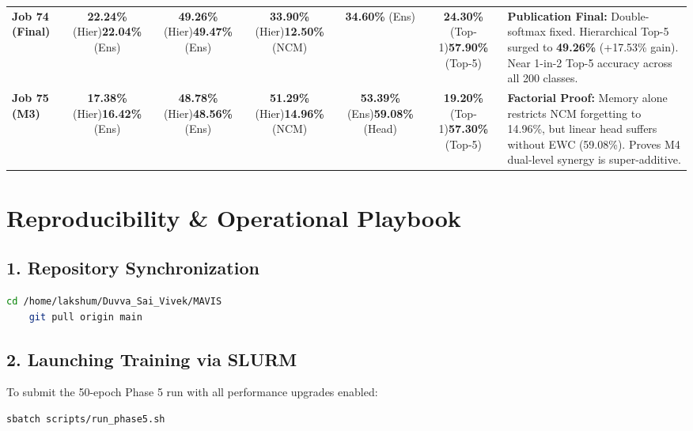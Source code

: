 \documentclass[11pt,a4paper]{article}
\begin{document}
\begin{table}[h!]
\begin{tabularx}{\textwidth}{p{3.2cm} c c c c c p{3.2cm}}
    \textbf{Job 74 (Final)} & \textbf{22.24\%} (Hier)\newline \textbf{22.04\%} (Ens) & \textbf{49.26\%} (Hier)\newline \textbf{49.47\%} (Ens) & \textbf{33.90\%} (Hier)\newline \textbf{12.50\%} (NCM) & \textbf{34.60\%} (Ens) & \textbf{24.30\%} (Top-1)\newline \textbf{57.90\%} (Top-5) & \textbf{Publication Final:} Double-softmax fixed. Hierarchical Top-5 surged to \textbf{49.26\%} (+17.53\% gain). Near 1-in-2 Top-5 accuracy across all 200 classes. \\
    \textbf{Job 75 (M3)} & \textbf{17.38\%} (Hier)\newline \textbf{16.42\%} (Ens) & \textbf{48.78\%} (Hier)\newline \textbf{48.56\%} (Ens) & \textbf{51.29\%} (Hier)\newline \textbf{14.96\%} (NCM) & \textbf{53.39\%} (Ens)\newline \textbf{59.08\%} (Head) & \textbf{19.20\%} (Top-1)\newline \textbf{57.30\%} (Top-5) & \textbf{Factorial Proof:} Memory alone restricts NCM forgetting to 14.96\%, but linear head suffers without EWC (59.08\%). Proves M4 dual-level synergy is super-additive. \\
    \bottomrule
    \end{tabularx}
    \end{table}

    \section{Reproducibility \& Operational Playbook}
    \label{sec:reproducibility}

    \subsection{1. Repository Synchronization}
    \begin{lstlisting}[language=bash]
    cd /home/lakshum/Duvva_Sai_Vivek/MAVIS
    git pull origin main
    \end{lstlisting}

    \subsection{2. Launching Training via SLURM}
    To submit the 50-epoch Phase 5 run with all performance upgrades enabled:
    \begin{lstlisting}[language=bash]
    sbatch scripts/run_phase5.sh
    \end{lstlisting}
\end{document}
